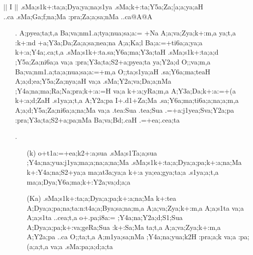 \begin{center}
$||$ {\sktb I }$||$ {\sktb .sMa;s1k+:ta;a;Dya;ya;na;s1ya
.sMa;k+:ta;Y5a;Za;[a;a;ya;aH\\ ..ca .sMa;Ga;f;na;Ma
:pra;Za;a;sa;nMa ..ca@A@A}
\end{center}

\begin{itemize}
 \item[{\sktf 29}.] {\sktf A;pyea;ta;t,a Ba;va;nm1.a;tya;nua;sa;a:=%
+Na A;a;va;Zya;k+:m,a\ZF{,} ya;t,a :k+:nd%
+a;Y3a;Da;Za;a;sa;nea;na A;a;Ka;l%
\ZF{-}Ba;a:=+ti6a;a;ya;a k+:a;Y4a;.ca;t,a .sMa;s1k+:ta.sa;Y6a;ma;Y3a;taH .sMa;s1k+:ta;a;d%
;Y5a;Za;ni6a;a va;a :pra;Y3a;ta;S2+a;pyea;ta  ya;Y2a;d
O;;va;m,a\ZF{,} Ba;va;nm1.a;ta;a;nua;sa;a:=+m,a O;;ta;s1ya;aH
.sa;Y6a;ma;teaH A;a;d;ea;Y5a;Za;nya;aH {va;a} .sMa{;Y2a;va}{;Da;a};nMa \ZF{(};Y4a;na;ma;Ra;Na;pra;k+:a:=H va;a\ZF{),}
k+:a;yRa;m,a\ZF{,} A;Y3a;Da;k+:a:=+(a k+:a;d;ZaH .s1ya;a;t,a  A;Y2a;pa I+.d1+Za;Ma
.sa;Y6a;ma;ti6a;a;na;a;m,a A;a;d;Y5a;Za;ni6a;a;na;Ma {va;a} .tea:Sua .tea;Sua .=+a:j1yea;Sva;Y2a;pa :pra;Y3a;ta;S2+a;pa;nMa
Ba;va;Bd;.caH .=+ea;.cea;ta}
 
 \item[{\sktf 30}.] \begin{itemize}
                 
                 \item[({\sktf k})] {\sktf o+t1a:=+ea;k2+:a;sua
.sMa;s1Ta;a;sua ;Y4a;na;yua:j1ya;ma;a;na;a;na;Ma .sMa;s1k+:ta;a;Dya;a;pa;k+:a;na;Ma k+:Y4a;na;S2+ya;a ma;at3a;ya;a k+:a ya;ea;gya;ta;a .s1ya;a;t,a\ZF{)}
ma;a;Dya;Y6a;ma;k+:Y2a;va;d;a;a}
                 
                 \item[({\sktf Ka})] {\sktf .sMa;s1k+:ta;a;Dya;a;pa;k+:a;na;Ma k+:tea
A;Dya;a;pa;na;ta:n:t4a;a;Bya;sa;na;m,a A;a;va;Zya;k+:m,a
A;a;s1ta va;a A;a;s1ta ..cea;t,a\ZF{,} o+.pa;i8a:= ;Y4a;na;Y2a;d;S1;Sua
A;Dya;a;pa;k+:va;geRa;Sua :k+:Sa;Ma ta;t,a A;a;va;Zya;k+:m,a
A;Y2a;pa ..ca\ZF{,} O;;ta;t,a A;m1ya;sa;nMa ;Y4a;na;yua;k2H%
 :pra;a;k va;a :pa;(a;a;t,a {va;a} .sMa{:pa;a};d;a;ta} 
                 

\end{itemize}
\end{itemize}
